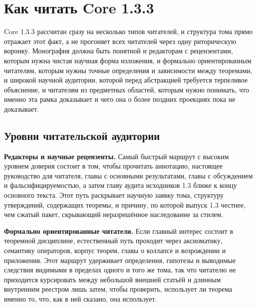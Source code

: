 \section{Как читать Core 1.3.3}

Core 1.3.3 рассчитан сразу на несколько типов читателей, и структура тома прямо отражает этот факт, а не прогоняет всех читателей через одну риторическую воронку.
Монография должна быть понятной и редакторам с рецензентами, которым нужна чистая научная форма изложения, и формально ориентированным читателям, которым нужны точные определения и зависимости между теоремами, и широкой научной аудитории, которой перед абстракцией требуется терпеливое объяснение, и читателям из предметных областей, которым нужно понимать, что именно эта рамка доказывает и чего она о более поздних проекциях пока не доказывает.

\subsection{Уровни читательской аудитории}

\textbf{Редакторы и научные рецензенты.}
Самый быстрый маршрут с высоким уровнем доверия состоит в том, чтобы прочитать аннотацию, настоящее руководство для читателя, главы с основными результатами, главы с обсуждением и фальсифицируемостью, а затем главу аудита исходников 1.3 ближе к концу основного текста. Этот путь раскрывает научную заявку тома, структуру утверждений, содержащих теоремы, и причину, по которой выпуск 1.3 честнее, чем сжатый пакет, скрывающий неразрешённое наследование за стилем.

\textbf{Формально ориентированные читатели.}
Если главный интерес состоит в теоремной дисциплине, естественный путь проходит через аксиоматику, семантику операторов, корпус теорем, главы о коллапсе и возрождении и приложения. Этот маршрут удерживает определения, гипотезы и выводимые следствия видимыми в пределах одного и того же тома, так что читателю не приходится курсировать между небольшой внешней статьёй и длинным внутренним реестром лишь затем, чтобы проверить, использует ли теорема именно то, что, как в ней сказано, она использует.

